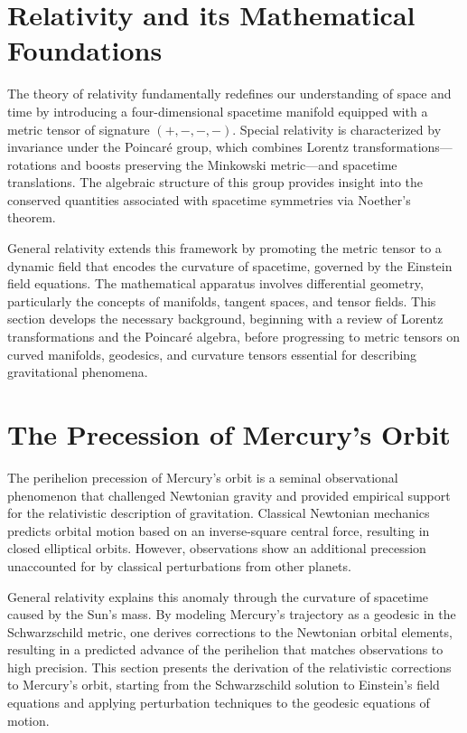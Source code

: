 \documentclass{amsart}
\theoremstyle{remark}
\begin{document}
\section{Relativity and its Mathematical Foundations}
\label{sec:relativity}

The theory of relativity fundamentally redefines our understanding of space and time by introducing a four-dimensional spacetime manifold equipped with a metric tensor of signature \((+,-,-,-)\). Special relativity is characterized by invariance under the Poincaré group, which combines Lorentz transformations—rotations and boosts preserving the Minkowski metric—and spacetime translations. The algebraic structure of this group provides insight into the conserved quantities associated with spacetime symmetries via Noether’s theorem.

General relativity extends this framework by promoting the metric tensor to a dynamic field that encodes the curvature of spacetime, governed by the Einstein field equations. The mathematical apparatus involves differential geometry, particularly the concepts of manifolds, tangent spaces, and tensor fields. This section develops the necessary background, beginning with a review of Lorentz transformations and the Poincaré algebra, before progressing to metric tensors on curved manifolds, geodesics, and curvature tensors essential for describing gravitational phenomena.

\section{The Precession of Mercury’s Orbit}
\label{sec:mercury}

The perihelion precession of Mercury’s orbit is a seminal observational phenomenon that challenged Newtonian gravity and provided empirical support for the relativistic description of gravitation. Classical Newtonian mechanics predicts orbital motion based on an inverse-square central force, resulting in closed elliptical orbits. However, observations show an additional precession unaccounted for by classical perturbations from other planets.

General relativity explains this anomaly through the curvature of spacetime caused by the Sun’s mass. By modeling Mercury’s trajectory as a geodesic in the Schwarzschild metric, one derives corrections to the Newtonian orbital elements, resulting in a predicted advance of the perihelion that matches observations to high precision. This section presents the derivation of the relativistic corrections to Mercury’s orbit, starting from the Schwarzschild solution to Einstein’s field equations and applying perturbation techniques to the geodesic equations of motion.
\end{document}
